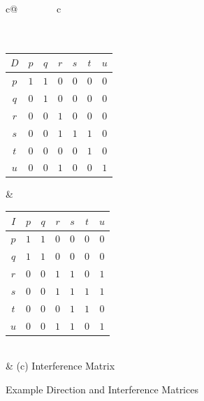 \begin{figure}
\centering
\begin{tabular}{c@{$\qquad\qquad$}c}
 \\
 \\ \\
\scalebox{0.80} { \begin{tabular}{|c||c|c|c|c|c|c|}
\hline
$D$ & $p$ & $q$ & $r$ & $s$ & $t$ & $u$ \\ \hline \hline
$p$ & $1$ & $1$ & $0$ & $0$ & $0$ & $0$ \\ \hline 
$q$ & $0$ & $1$ & $0$ & $0$ & $0$ & $0$ \\ \hline 
$r$ & $0$ & $0$ & $1$ & $0$ & $0$ & $0$ \\ \hline 
$s$ & $0$ & $0$ & $1$ & $1$ & $1$ & $0$ \\ \hline 
$t$ & $0$ & $0$ & $0$ & $0$ & $1$ & $0$ \\ \hline 
$u$ & $0$ & $0$ & $1$ & $0$ & $0$ & $1$ \\ \hline 
\end{tabular}} 
& 
\scalebox{0.80} {\begin{tabular}{|c||c|c|c|c|c|c|}
\hline
$I$ & $p$ & $q$ & $r$ & $s$ & $t$ & $u$ \\ \hline \hline
$p$ & $1$ & $1$ & $0$ & $0$ & $0$ & $0$ \\ \hline 
$q$ & $1$ & $1$ & $0$ & $0$ & $0$ & $0$ \\ \hline 
$r$ & $0$ & $0$ & $1$ & $1$ & $0$ & $1$ \\ \hline 
$s$ & $0$ & $0$ & $1$ & $1$ & $1$ & $1$ \\ \hline 
$t$ & $0$ & $0$ & $0$ & $1$ & $1$ & $0$ \\ \hline 
$u$ & $0$ & $0$ & $1$ & $1$ & $0$ & $1$ \\ \hline 
\end{tabular}}  \\
  & \scalebox{0.80} {(c) Interference Matrix}
\end{tabular}
\caption{Example Direction and Interference Matrices}
\label{fig:relwork_1}
\end{figure}
